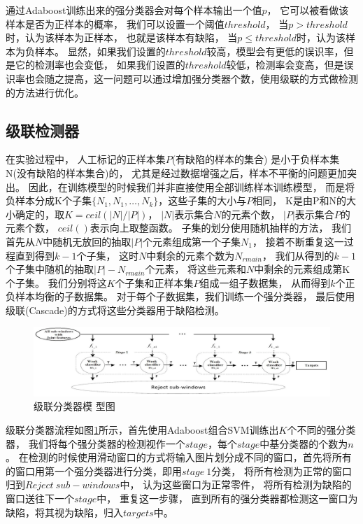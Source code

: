 通过Adaboost训练出来的强分类器会对每个样本输出一个值$p$，
它可以被看做该样本是否为正样本的概率，
我们可以设置一个阈值$threshold$，
当$p>threshold$时，认为该样本为正样本，
也就是该样本有缺陷，
当$p\leq threshold$时，认为该样本为负样本。
显然，如果我们设置的$threshold$较高，模型会有更低的误识率，但是它的检测率也会变低，
如果我们设置的$threshold$较低，检测率会变高，但是误识率也会随之提高，这一问题可以通过增加强分类器个数，使用级联的方式做检测的方法进行优化。

\subsection{级联检测器}
\label{subsection:jilianjianceqi}

在实验过程中，
人工标记的正样本集$P$(有缺陷的样本的集合)
是小于负样本集N(没有缺陷的样本集合)的，
尤其是经过数据增强之后，样本不平衡的问题更加突出。
因此，在训练模型的时候我们并非直接使用全部训练样本训练模型，
而是将负样本分成K个子集$\{N_1,N_1,\dots,N_k\}$，这些子集的大小与$P$相同，
K是由P和N的大小确定的，取$K=ceil(|N|/|P|)$，
$|N|$表示集合$N$的元素个数，
$|P|$表示集合$P$的元素个数，
$ceil()$表示向上取整函数。
子集的划分使用随机抽样的方法，
我们首先从$N$中随机无放回的抽取$|P|$个元素组成第一个子集$N_1$，
接着不断重复这一过程直到得到$k-1$个子集，
这时$N$中剩余的元素个数为$N_{rmain}$，
我们从得到的$k-1$个子集中随机的抽取$|P|-N_{rmain}$个元素，
将这些元素和$N$中剩余的元素组成第K个子集。
我们分别将这$K$个子集和正样本集$P$组成一组子数据集，
从而得到$k$个正负样本均衡的子数据集。
对于每个子数据集，我们训练一个强分类器，
最后使用级联\cite{viola2001rapid}(Cascade)的方式将这些分类器用于缺陷检测。

\begin{figure}[htbp]
\centering
\includegraphics[width=1.0\linewidth]{figures/cascade.png}
\caption{级联分类器模 型图}
\label{fig:cascade}
\end{figure}
级联分类器流程如图\ref{fig:cascade}所示，首先使用Adaboost组合SVM训练出$K$个不同的强分类器，
我们将每个强分类器的检测视作一个$stage$，每个$stage$中基分类器的个数为$n$。
在检测的时候使用滑动窗口的方式将输入图片划分成不同的窗口，首先将所有的窗口用第一个强分类器进行分类，即用$stage~1$分类，
将所有检测为正常的窗口归到$Reject~sub-windows$中，
认为这些窗口为正常零件，
将所有检测为缺陷的窗口送往下一个$stage$中，
重复这一步骤，
直到所有的强分类器都检测这一窗口为缺陷，将其视为缺陷，归入$targets$中。

